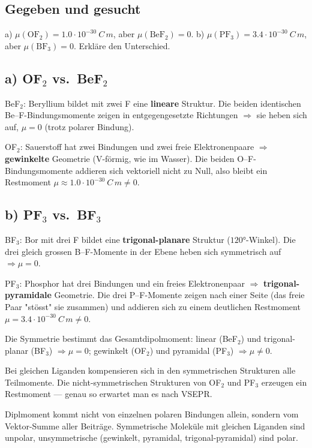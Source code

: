 
\subsection*{Gegeben und gesucht}
a) $\mu(\mathrm{OF_2}) = 1.0\cdot10^{-30}\ C\,m$, aber $\mu(\mathrm{BeF_2}) = 0$.
b) $\mu(\mathrm{PF_3}) = 3.4\cdot10^{-30}\ C\,m$, aber $\mu(\mathrm{BF_3}) = 0$.
Erkläre den Unterschied.

\subsection*{a) OF$_2$ vs.\ BeF$_2$}
BeF$_2$: Beryllium bildet mit zwei F eine \textbf{lineare} Struktur. Die
beiden identischen Be--F-Bindungsmomente zeigen in entgegengesetzte
Richtungen
$\Rightarrow$ sie heben sich auf, $\mu = 0$ (trotz polarer Bindung).

OF$_2$: Sauerstoff hat zwei Bindungen und zwei freie Elektronenpaare
$\Rightarrow$ \textbf{gewinkelte} Geometrie (V-förmig, wie im Wasser).
Die beiden O--F-Bindungsmomente addieren sich vektoriell nicht zu Null,
also bleibt ein Restmoment $\mu \approx 1.0\cdot10^{-30}\ C\,m\neq 0$.

\subsection*{b) PF$_3$ vs.\ BF$_3$}
BF$_3$: Bor mit drei F bildet eine \textbf{trigonal-planare} Struktur
($120°$-Winkel). Die drei gleich grossen B--F-Momente in der Ebene heben sich
symmetrisch auf $\Rightarrow \mu = 0$.

PF$_3$: Phosphor hat drei Bindungen und ein freies Elektronenpaar $\Rightarrow$
\textbf{trigonal-pyramidale} Geometrie. Die drei P--F-Momente zeigen nach
einer Seite (das freie Paar "stösst" sie zusammen) und addieren sich zu einem
deutlichen Restmoment $\mu = 3.4\cdot10^{-30}\ C\,m\neq 0$.

\begin{ergebnis}
Die Symmetrie bestimmt das Gesamtdipolmoment: linear (BeF$_2$) und
trigonal-planar (BF$_3$) $\Rightarrow \mu=0$; gewinkelt (OF$_2$) und pyramidal
(PF$_3$) $\Rightarrow \mu\neq 0$.
\end{ergebnis}

\begin{kontrolle}
Bei gleichen Liganden kompensieren sich in den symmetrischen Strukturen alle
Teilmomente. Die nicht-symmetrischen Strukturen von OF$_2$ und PF$_3$
erzeugen ein Restmoment --- genau so erwartet man es nach VSEPR.
\end{kontrolle}

\begin{merksatz}
Diplmoment kommt nicht von einzelnen polaren Bindungen allein, sondern vom
Vektor-Summe aller Beiträge. Symmetrische Moleküle mit gleichen Liganden sind
unpolar, unsymmetrische (gewinkelt, pyramidal, trigonal-pyramidal) sind polar.
\end{merksatz}
